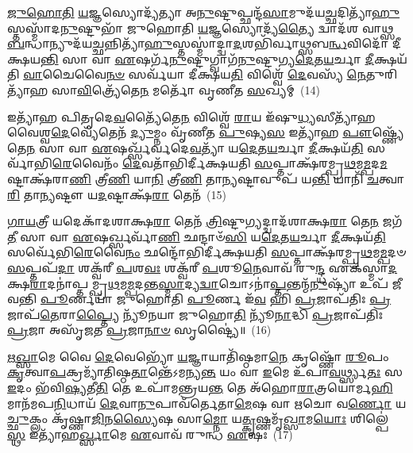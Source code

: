 \-\ul{𑌜𑍁}\-\-\ul{𑌹𑍋}\-\-\ul{𑌤𑌿} \ul{𑌯}\-𑌜𑍍𑌞𑌸𑍍𑌯𑍋𑌦𑍍𑌯᳴𑌤𑍍𑌯𑌾 𑌅\-\ul{𑌨𑍁}\-𑌷𑍍𑌟𑍁𑌪𑍍𑌛𑌨𑍍𑌦᳴\-\ul{𑌸𑌾}\-𑌮𑍁𑌦᳴𑌯\-\ul{𑌚𑍍𑌛}\-𑌦𑌿𑌤𑍍𑌯𑌾᳴\-\ul{𑌹𑍁}\-𑌸𑍍𑌤𑌸𑍍𑌮𑌾᳴𑌦\-\ul{𑌨𑍁}\-𑌷𑍍𑌟𑍁𑌭𑌾᳴ 𑌜𑍁𑌹𑍋𑌤𑌿 \ul{𑌯}\-𑌜𑍍𑌞𑌸𑍍𑌯𑍋𑌦𑍍𑌯᳴\-\ul{𑌤𑍍𑌯𑍈} 𑌦𑍍𑌵𑌾𑌦᳴𑌶 𑌵𑌾𑌥𑍍𑌸\-\ul{𑌬}\-𑌨𑍍𑌧𑌾𑌨𑍍𑌯𑍁𑌦᳴𑌯\-\ul{𑌚𑍍𑌛}\-𑌨𑍍𑌨𑌿𑌤𑍍𑌯𑌾᳴\-\ul{𑌹𑍁}\-𑌸𑍍𑌤𑌸𑍍𑌮𑌾॑𑌦𑍍𑌦𑍍𑌵𑌾\-\ul{𑌦}\-𑌶𑌭𑌿᳴𑌰𑍍𑌵𑌾𑌥𑍍𑌸𑌬\-\ul{𑌨𑍍𑌧}\-𑌵𑌿𑌦𑍋᳴ 𑌦𑍀𑌕𑍍𑌷𑌯\-\ul{𑌨𑍍𑌤𑌿} 𑌸𑌾 𑌵𑌾 \ul{𑌏}\-𑌷𑌰𑍍𑌗᳴\-\ul{𑌨𑍁}\-𑌷𑍍𑌟𑍁𑌗𑍍𑌵𑌾𑌗᳴\-\ul{𑌨𑍁}\-𑌷𑍍𑌟𑍁𑌗𑍍𑌯\-\ul{𑌦𑍇}\-𑌤\-\ul{𑌯}\-𑌰𑍍𑌚𑌾 \ul{𑌦𑍀}\-𑌕𑍍𑌷𑌯᳴𑌤𑌿 \ul{𑌵𑌾}\-𑌚𑍈𑌵𑍈\-\ul{𑌨}\-\-\ul{𑍞} 𑌸𑌰𑍍𑌵᳴𑌯𑌾 𑌦𑍀𑌕𑍍𑌷𑌯\-\ul{𑌤𑌿} 𑌵𑌿𑌶𑍍𑌵𑍇᳴ \ul{𑌦𑍇}\-𑌵𑌸𑍍𑌯᳴ \ul{𑌨𑍇}\-𑌤𑍁𑌰𑌿𑌤𑍍𑌯𑌾᳴𑌹 𑌸𑌾\-\ul{𑌵𑌿}\-𑌤𑍍𑌰𑍍𑌯𑍇᳴𑌤𑍇\-\ul{𑌨} 𑌮𑌰𑍍𑌤𑍋᳴ 𑌵𑍃𑌣𑍀𑌤 \ul{𑌸}\-𑌖𑍍𑌯𑌮𑍍~(14)

𑌇𑌤𑍍𑌯𑌾᳴𑌹 𑌪𑌿𑌤𑍃𑌦𑍇\-\ul{𑌵}\-𑌤𑍍𑌯𑍈᳴𑌤𑍇\-\ul{𑌨} 𑌵𑌿𑌶𑍍𑌵𑍇᳴ \ul{𑌰𑌾}\-𑌯 𑌇᳴𑌷𑍁\-\ul{𑌧𑍍𑌯}\-𑌸𑍀𑌤𑍍𑌯𑌾᳴𑌹 𑌵𑍈𑌶𑍍𑌵\-\ul{𑌦𑍇}\-𑌵𑍍𑌯𑍇᳴𑌤𑍇𑌨᳴ \ul{𑌦𑍍𑌯𑍁}\-𑌮𑍍𑌨𑌂 𑌵𑍃᳴𑌣𑍀𑌤 \ul{𑌪𑍁}\-𑌷𑍍𑌯\-\ul{𑌸} 𑌇𑌤𑍍𑌯𑌾᳴𑌹 \ul{𑌪𑍗}\-𑌷𑍍𑌣𑍍𑌯𑍇᳴𑌤𑍇\-\ul{𑌨} 𑌸𑌾 𑌵𑌾 \ul{𑌏}\-𑌷𑌰𑍍𑌖𑍍𑌸᳴𑌰𑍍𑌵𑌦𑍇\-\ul{𑌵}\-𑌤𑍍𑌯𑌾᳴ 𑌯\-\ul{𑌦𑍇}\-𑌤\-\ul{𑌯}\-𑌰𑍍𑌚𑌾 \ul{𑌦𑍀}\-𑌕𑍍𑌷𑌯᳴\-\ul{𑌤𑌿} 𑌸𑌰𑍍𑌵𑌾᳴𑌭𑌿\-\ul{𑌰𑍇}\-𑌵𑍈𑌨𑌂᳴ \ul{𑌦𑍇}\-𑌵𑌤𑌾᳴𑌭𑌿𑌰𑍍𑌦𑍀𑌕𑍍𑌷𑌯𑌤𑌿 \ul{𑌸}\-𑌪𑍍𑌤𑌾𑌕𑍍𑌷᳴𑌰𑌮𑍍𑌪𑍍𑌰\-\ul{𑌥}\-𑌮\-\ul{𑌮𑍍𑌪}\-𑌦\-\ul{𑌮}\-𑌷𑍍𑌟𑌾𑌕𑍍𑌷᳴𑌰𑌾\-\ul{𑌣𑌿} 𑌤𑍍𑌰𑍀\-\ul{𑌣𑌿} 𑌯𑌾\-\ul{𑌨𑌿} 𑌤𑍍𑌰𑍀\-\ul{𑌣𑌿} 𑌤𑌾\-\ul{𑌨𑍍𑌯}\-𑌷𑍍𑌟𑌾𑌵𑍁𑌪᳴ 𑌯\-\ul{𑌨𑍍𑌤𑌿} 𑌯𑌾𑌨𑌿᳴ \ul{𑌚}\-𑌤𑍍𑌵𑌾\-\ul{𑌰𑌿} 𑌤𑌾\-\ul{𑌨𑍍𑌯}\-𑌷𑍍𑌟𑍗 𑌯\-\ul{𑌦}\-𑌷𑍍𑌟𑌾𑌕𑍍𑌷᳴\-\ul{𑌰𑌾} 𑌤𑍇𑌨᳴~(15)

\-\ul{𑌗𑌾}\-\-\ul{𑌯}\-𑌤𑍍𑌰𑍀 𑌯𑌦𑍇𑌕𑌾᳴\-𑌦𑌶𑌾𑌕𑍍𑌷\-\ul{𑌰𑌾} 𑌤𑍇𑌨᳴ \ul{𑌤𑍍𑌰𑌿}\-𑌷𑍍𑌟𑍁𑌗𑍍𑌯𑌦𑍍𑌦𑍍𑌵𑌾𑌦᳴𑌶𑌾𑌕𑍍𑌷\-\ul{𑌰𑌾} 𑌤𑍇\-\ul{𑌨} 𑌜𑌗᳴\-\ul{𑌤𑍀} 𑌸𑌾 𑌵𑌾 \ul{𑌏}\-𑌷𑌰𑍍𑌖𑍍𑌸𑌰𑍍𑌵𑌾᳴\-\ul{𑌣𑌿} 𑌛𑌨𑍍𑌦𑌾𑍞᳴\-\ul{𑌸𑌿} 𑌯\-\ul{𑌦𑍇}\-𑌤\-\ul{𑌯}\-𑌰𑍍𑌚𑌾 \ul{𑌦𑍀}\-𑌕𑍍𑌷𑌯᳴\-\ul{𑌤𑌿} 𑌸𑌰𑍍𑌵𑍇᳴𑌭𑌿\-\ul{𑌰𑍇}\-𑌵𑍈\-\ul{𑌨𑌂} 𑌛𑌨𑍍𑌦𑍋᳴𑌭𑌿𑌰𑍍𑌦𑍀𑌕𑍍𑌷𑌯𑌤𑌿 \ul{𑌸}\-𑌪𑍍𑌤𑌾𑌕𑍍𑌷᳴𑌰𑌮𑍍𑌪𑍍𑌰\-\ul{𑌥}\-𑌮\-\ul{𑌮𑍍𑌪}\-𑌦𑍞 \ul{𑌸}\-𑌪𑍍𑌤𑌪᳴\-\ul{𑌦𑌾} 𑌶𑌕𑍍𑌵᳴𑌰𑍀 \ul{𑌪}\-𑌶\-\ul{𑌵𑌃} 𑌶𑌕𑍍𑌵᳴𑌰𑍀 \ul{𑌪}\-𑌶𑍂\-\ul{𑌨𑍇}\-𑌵𑌾𑌵᳴ 𑌰𑍁\-\ul{𑌨𑍍𑌦𑍍𑌧} 𑌏𑌕᳴𑌸𑍍𑌮𑌾\-\ul{𑌦}\-𑌕𑍍𑌷\-\ul{𑌰𑌾}\-𑌦𑌨𑌾॑𑌪𑍍𑌤𑌮𑍍𑌪𑍍𑌰\-\ul{𑌥}\-𑌮\-\ul{𑌮𑍍𑌪}\-𑌦𑌨𑍍𑌤\-\ul{𑌸𑍍𑌮𑌾}\-𑌦𑍍𑌯\-\ul{𑌦𑍍𑌵𑌾}\-𑌚𑍋\-𑌽𑌨𑌾॑\-\ul{𑌪𑍍𑌤}\-𑌨𑍍𑌤𑌨𑍍𑌮᳴\-\ul{𑌨𑍁}\-𑌷𑍍𑌯𑌾᳴ 𑌉𑌪᳴ 𑌜𑍀𑌵𑌨𑍍𑌤𑌿 \ul{𑌪𑍂}\-𑌰𑍍𑌣𑌯𑌾᳴ 𑌜𑍁𑌹𑍋𑌤𑌿 \ul{𑌪𑍂}\-𑌰𑍍𑌣 𑌇᳴\-\ul{𑌵} 𑌹𑌿 \ul{𑌪𑍍𑌰}\-𑌜𑌾𑌪᳴𑌤𑌿𑌃 \ul{𑌪𑍍𑌰}\-𑌜𑌾𑌪᳴\-\ul{𑌤𑍇}\-𑌰𑌾\-\ul{𑌪𑍍𑌤𑍍𑌯𑍈} 𑌨𑍍𑌯𑍂᳴𑌨𑌯𑌾 𑌜𑍁𑌹𑍋\-\ul{𑌤𑌿} 𑌨𑍍𑌯𑍂᳴\-\ul{𑌨𑌾}\-𑌦𑍍𑌧𑌿 \ul{𑌪𑍍𑌰}\-𑌜𑌾𑌪᳴𑌤𑌿𑌃 \ul{𑌪𑍍𑌰}\-𑌜𑌾 𑌅𑌸𑍃᳴𑌜𑌤 \ul{𑌪𑍍𑌰}\-𑌜𑌾\-\ul{𑌨𑌾}\-\-\ul{𑍞} 𑌸𑍃𑌷𑍍𑌟𑍍𑌯𑍈॑॥~(16)

{\anuvakamend[{\-\ul{𑌅}\-𑌗𑍍𑌨\-\ul{𑌯𑍇} 𑌤𑌾 𑌵𑍃᳴𑌧𑌾\-\ul{𑌤𑍍𑌵𑍃}\-𑌚𑌾 \ul{𑌸}\-𑌖𑍍𑌯𑌨𑍍𑌤𑍇𑌨᳴ 𑌜𑍁𑌹𑍋\-\ul{𑌤𑌿} 𑌪𑌞𑍍𑌚᳴𑌦𑌶 𑌚}]}%

\-\ul{𑌋}\-\-\ul{𑌖𑍍𑌸𑌾}\-𑌮𑍇 𑌵𑍈 \ul{𑌦𑍇}\-𑌵𑍇𑌭𑍍𑌯𑍋᳴ \ul{𑌯}\-𑌜𑍍𑌞𑌾𑌯𑌾𑌤𑌿᳴𑌷𑍍𑌠𑌮𑌾\-\ul{𑌨𑍇} 𑌕𑍃𑌷𑍍𑌣𑍋᳴ \ul{𑌰𑍂}\-𑌪𑌂 \ul{𑌕𑍃}\-𑌤𑍍𑌵𑌾\-\ul{𑌪}\-𑌕𑍍𑌰𑌮𑍍𑌯𑌾᳴𑌤𑌿𑌷𑍍𑌠\-\ul{𑌤𑌾}\-𑌨𑍍𑌤𑍇᳴\-𑌽𑌮𑌨𑍍𑌯\-\ul{𑌨𑍍𑌤} 𑌯𑌂 𑌵𑌾 \ul{𑌇}\-𑌮𑍇 𑌉᳴𑌪𑌾\-\ul{𑌵}\-𑌰𑍍𑌥𑍍𑌸𑍍𑌯\-\ul{𑌤𑌃} 𑌸 \ul{𑌇}\-𑌦𑌂 𑌭᳴𑌵𑌿\-\ul{𑌷𑍍𑌯}\-𑌤𑍀\-\ul{𑌤𑌿} 𑌤𑍇 𑌉𑌪𑌾᳴𑌮𑌨𑍍𑌤𑍍𑌰𑌯\-\ul{𑌨𑍍𑌤} 𑌤𑍇 𑌅᳴𑌹𑍋\-\ul{𑌰𑌾}\-𑌤𑍍𑌰𑌯𑍋॑𑌰𑍍𑌮\-\ul{𑌹𑌿}\-𑌮𑌾𑌨᳴𑌮𑌪\-\ul{𑌨𑌿}\-𑌧𑌾𑌯᳴ \ul{𑌦𑍇}\-𑌵𑌾\-\ul{𑌨𑍁}\-𑌪𑌾𑌵᳴𑌰𑍍𑌤𑍇𑌤𑌾\-\ul{𑌮𑍇}\-𑌷 𑌵𑌾 \ul{𑌋}\-𑌚𑍋 𑌵\-\ul{𑌰𑍍𑌣𑍋} 𑌯\-\ul{𑌚𑍍𑌛𑍁}\-𑌕𑍍𑌲𑌂 𑌕𑍃᳴𑌷𑍍𑌣𑌾\-\ul{𑌜𑌿}\-𑌨\-\ul{𑌸𑍍𑌯𑍈}\-𑌷 𑌸𑌾\-\ul{𑌮𑍍𑌨𑍋} 𑌯\-\ul{𑌤𑍍𑌕𑍃}\-𑌷𑍍𑌣𑌮𑍃᳴\-\ul{𑌖𑍍𑌸𑌾}\-𑌮\-\ul{𑌯𑍋𑌃} 𑌶𑌿𑌲𑍍𑌪𑍇॑ \ul{𑌸𑍍𑌥} 𑌇𑌤𑍍𑌯𑌾᳴𑌹\-\ul{𑌰𑍍𑌖𑍍𑌸𑌾}\-𑌮𑍇 \ul{𑌏}\-𑌵𑌾𑌵᳴ 𑌰𑍁𑌨𑍍𑌧 \ul{𑌏}\-𑌷𑌃~(17)

